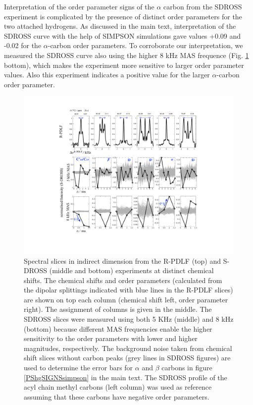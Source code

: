 \documentclass[journal=jpcbfk]{achemso}
\begin{document}
Interpretation of the order parameter signs of the $\alpha$ carbon from the SDROSS experiment
is complicated by the presence of distinct order parameters for the two attached hydrogens.
As discussed in the main text, interpretation of the SDROSS curve with the help of SIMPSON
simulations gave values +0.09 and -0.02 for the $\alpha$-carbon order parameters.
To corroborate our interpretation, we measured the SDROSS curve also using the higher 8 kHz
MAS frequence (Fig. \ref{DPslices} bottom), which makes the experiment more sensitive to larger order parameter values.
Also this experiment indicates a positive value for the larger $\alpha$-carbon order parameter.
\begin{figure}[]
  \includegraphics[width=\textwidth]{../Figs/SI_man.pdf}
  \caption{\label{DPslices}
    Spectral slices in indirect dimension from the R-PDLF (top) and S-DROSS (middle and bottom) experiments at distinct chemical shifts.
    The chemical shifts and order parameters (calculated from the dipolar splittings indicated with blue lines in the R-PDLF slices)
    are shown on top each column (chemical shift left, order parameter right).
    The assignment of columns is given in the middle.  
    The SDROSS slices were measured using both 5 KHz (middle) and 8 kHz (bottom) because different MAS frequencies enable the
    higher sensitivity to the order parameters with lower and higher magnitudes, respectively.
    The background noise taken from chemical shift slices without carbon peaks (grey lines in SDROSS figures)
    are used to determine the error bars for $\alpha$ and $\beta$ carbons in figure \ref{PShgSIGNSsimpson} in the main text.
    The SDROSS profile of the acyl chain methyl carbons (left column) was used as reference assuming that these carbons have negative order parameters.  
  }
\end{figure}
\end{document}
